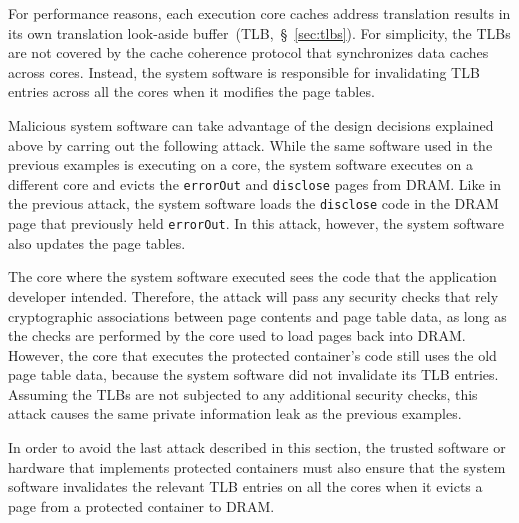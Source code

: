 For performance reasons, each execution core caches address translation results
in its own translation look-aside buffer~(TLB,~\S~\ref{sec:tlbs}). For
simplicity, the TLBs are not covered by the cache coherence protocol that
synchronizes data caches across cores. Instead, the system software is
responsible for invalidating TLB entries across all the cores when it modifies
the page tables.

Malicious system software can take advantage of the design decisions explained
above by carring out the following attack. While the same software used in the
previous examples is executing on a core, the system software executes on a
different core and evicts the \texttt{errorOut} and \texttt{disclose} pages
from DRAM. Like in the previous attack, the system software loads the
\texttt{disclose} code in the DRAM page that previously held \texttt{errorOut}.
In this attack, however, the system software also updates the page tables.

The core where the system software executed sees the code that the application
developer intended. Therefore, the attack will pass any security checks that
rely cryptographic associations between page contents and page table data, as
long as the checks are performed by the core used to load pages back into DRAM.
However, the core that executes the protected container's code still uses the
old page table data, because the system software did not invalidate its TLB
entries. Assuming the TLBs are not subjected to any additional security checks,
this attack causes the same private information leak as the previous examples.

In order to avoid the last attack described in this section, the trusted
software or hardware that implements protected containers must also ensure that
the system software invalidates the relevant TLB entries on all the cores when
it evicts a page from a protected container to DRAM.
